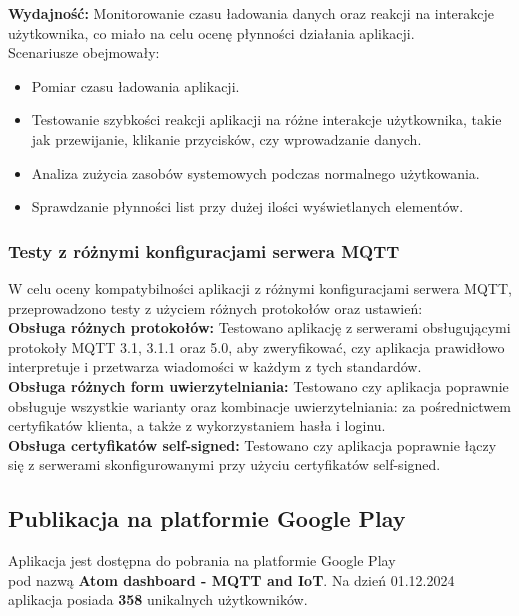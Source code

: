 \hspace{3em}

\textbf{Wydajność:} Monitorowanie czasu ładowania danych oraz reakcji na interakcje użytkownika, co miało na celu ocenę płynności działania aplikacji.\\

Scenariusze obejmowały:

\begin{itemize}[leftmargin=*]
    \item Pomiar czasu ładowania aplikacji.
    \item Testowanie szybkości reakcji aplikacji na różne interakcje użytkownika, takie jak przewijanie, klikanie przycisków, czy wprowadzanie danych.
    \item Analiza zużycia zasobów systemowych podczas normalnego użytkowania.
    \item Sprawdzanie płynności list przy dużej ilości wyświetlanych elementów.
\end{itemize}

\newpage

\subsubsection{Testy z różnymi konfiguracjami serwera MQTT}
W celu oceny kompatybilności aplikacji z różnymi konfiguracjami serwera MQTT, przeprowadzono testy z użyciem różnych protokołów oraz ustawień:\\

\textbf{Obsługa różnych protokołów:} Testowano aplikację z serwerami obsługującymi protokoły MQTT 3.1, 3.1.1 oraz 5.0, aby zweryfikować, czy aplikacja prawidłowo interpretuje i przetwarza wiadomości w każdym z tych standardów.\\

\textbf{Obsługa różnych form uwierzytelniania:} Testowano czy aplikacja poprawnie obsługuje wszystkie warianty oraz kombinacje uwierzytelniania: za pośrednictwem certyfikatów klienta, a także z wykorzystaniem hasła i loginu.\\

\textbf{Obsługa certyfikatów self-signed:} Testowano czy aplikacja poprawnie łączy się z serwerami skonfigurowanymi przy użyciu certyfikatów self-signed.

\newpage

\subsection{Publikacja na platformie Google Play}
Aplikacja jest dostępna do pobrania na platformie Google Play\\pod nazwą \textbf{Atom dashboard - MQTT and IoT}.
Na dzień 01.12.2024 aplikacja posiada \textbf{358} unikalnych użytkowników.\\

